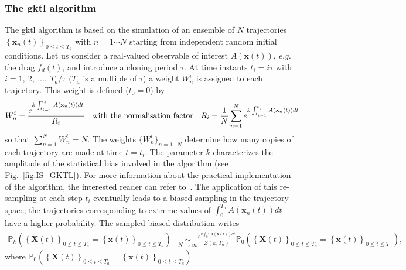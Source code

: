 \documentclass{jfm}
\begin{document}
\subsubsection{The \ac{gktl} algorithm}
\label{sec:gktl_description}
The \ac{gktl} algorithm is based on the simulation of an ensemble of $N$ trajectories $\left\{\mathbf{x}_{n}(t)\right\}_{0\leq t \leq T_a}$ with $ n =1 \cdots N$ starting from independent random initial conditions.
% 
Let us consider a real-valued observable of interest $A(\mathbf{x}(t))$, {\emph{e.g.} the drag $f_d(t)$}, and introduce a cloning period $\tau$.
% 
At time instants $t_{i}=i\tau$ with $i=1,~2,~...,~T_{a}/\tau$ ($T_{a}$ is a multiple of $\tau$) a weight $W_{n}^{i}$ is assigned to each trajectory. This weight is defined ($t_0=0$) by
% 
\begin{equation}
  W_{n}^{i}=\frac{e^{k\intop_{t_{i-1}}^{t_{i}}A(\mathbf{x}_{n}(t))dt}}{R_{i}}\quad \mbox{with the normalisation factor} \quad R_{i}=\frac{1}{N}\sum_{n=1}^{N}e^{k\int_{t_{i-1}}^{t_{i}}A(\mathbf{x}_{n}(t))dt}
  \label{eq:Weight}
\end{equation}
so that $\sum_{n=1}^N W_n^i = N$.
% 
% 
{The weights $\{W_{n}^{i}\}_{n=1\cdots N}$ determine how many copies of each trajectory are made at time $t=t_i$. The parameter $k$ characterizes the amplitude of the statistical bias involved in the algorithm (see Fig.~\ref{fig:IS_GKTL}). For more information about the practical implementation of the algorithm, the interested reader can refer to~\cite{brewer2018efficient, lestang:tel-01974316}}.
The application of this re-sampling at each step $t_i$ eventually leads to a biased sampling in the trajectory space; the trajectories corresponding to extreme values of $\int_{0}^{T_a}A(\mathbf{x}_{n}(t))dt$ have a higher probability.
% 
The sampled biased distribution writes
% 
\begin{align}
  \mathbb{P}_{k}\left(\left\{ \mathbf{X}(t)\right\} _{0\leq t\leq T_{a}}=\left\{ \mathbf{x}(t)\right\} _{0\leq t\leq T_{a}}\right) &\underset{N\rightarrow\infty}{\sim} \frac{e^{k\int_{0}^{T_{a}}A(\mathbf{x}(t))dt}}{Z(k,T_a)}\mathbb{\mathbb{P}}_{0}\left(\left\{ \mathbf{X}(t)\right\} _{0\leq t\leq T_{a}}=\left\{ \mathbf{x}(t)\right\} _{0\leq t\leq T_{a}}\right),
                                                                                                                                     \label{eq:Biased_Path_Approximation}
\end{align}
where
$\mathbb{P}_{0}\left(\left\{ \mathbf{X}(t)\right\} _{0\leq t\leq T_{a}} = \left\{ \mathbf{x}(t)\right\} _{0\leq t\leq T_{a}}\right)$
\end{document}
